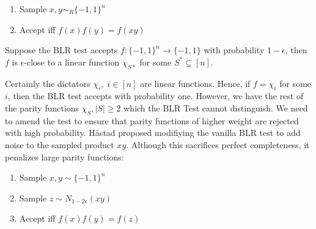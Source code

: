 \begin{enumerate}
  \item Sample $x,y \sim_R \{-1,1\}^n$
  \item Accept iff $f(x)f(y) = f(xy)$
\end{enumerate}

\begin{theorem}
  Suppose the BLR test accepts $f:\{-1,1\}^n \rightarrow \{-1,1\}$ with probability $1 - \epsilon$, then $f$ is $\epsilon$-close to a linear function $\chi_{S*}$ for some $S^* \subseteq [n]$.
\end{theorem}
%
Certainly the dictators $\chi_i, \; i \in [n]$ are linear functions. Hence, if $f = \chi_i$ for some $i$, then the BLR test accepts with probability one. However, we have the rest of the parity functions $\chi_{S}, |S| \geq 2$ which the BLR Test cannot distinguish. We need to amend the test to ensure that parity functions of higher weight are rejected with high probability. H\aa stad proposed modifiying the vanilla BLR test to add noise to the sampled product $xy$. Although this sacrifices perfect completeness, it penalizes large parity functions: \newline
%
\begin{enumerate}
  \item Sample $x,y \sim \{-1,1\}^n$
  \item Sample $z \sim N_{1-2\epsilon}(xy)$
  \item Accept iff $f(x)f(y)=f(z)$
\end{enumerate}
%

